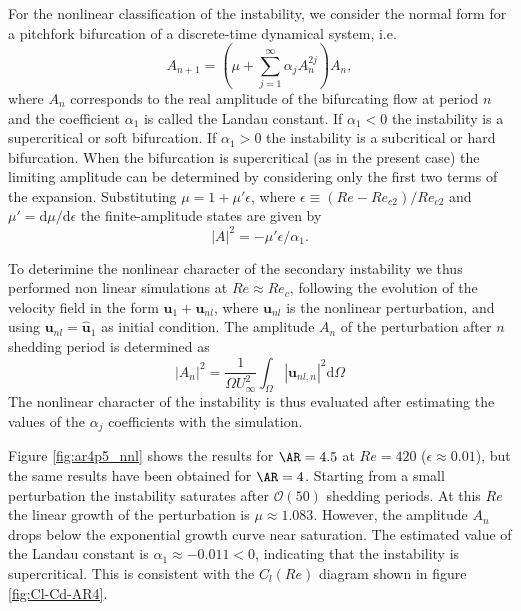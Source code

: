 For the nonlinear classification of the instability, we consider the normal form for a pitchfork bifurcation of a discrete-time dynamical system, i.e. 
%
\begin{equation}
  A_{n+1} = \left( \mu  + \sum_{j=1}^\infty \alpha_j A_n^{2j} \right) A_n,
\end{equation}
%
where $A_n$ corresponds to the real amplitude of the bifurcating flow at period $n$ and the coefficient $\alpha_1$ is called the Landau constant. If $\alpha_1 <0$ the instability is a supercritical or soft bifurcation. If $\alpha_1>0$ the instability is a subcritical or hard bifurcation. When the bifurcation is supercritical (as in the present case) the limiting amplitude can be determined by considering only the first two terms of the expansion. Substituting $\mu = 1 + \mu' \epsilon$, where $\epsilon \equiv (Re - Re_{c2})/Re_{c2}$ and $\mu' = \text{d}\mu/\text{d}\epsilon$ the finite-amplitude states are given by
%
\begin{equation}
  |A|^2 =- \mu' \epsilon / \alpha_1.
\end{equation}

To deterimine the nonlinear character of the secondary instability we thus performed non linear simulations at $Re \approx Re_c$, following the evolution of the velocity field in the form $\bm{u}_1 + \bm{u}_{nl}$, where $\bm{u}_{nl}$ is the nonlinear perturbation, and using $\bm{u}_{nl} = \hat{\bm{u}}_1$ as initial condition. The amplitude $A_n$ of the perturbation after $n$ shedding period is determined as
%
\begin{equation}
  |A_n|^2 = \frac{1}{\Omega U_\infty^2} \int_{\Omega} | \bm{u}_{nl,n} |^2 \text{d} \Omega
\end{equation}
%
The nonlinear character of the instability is thus evaluated after estimating the values of the $\alpha_j$ coefficients with the simulation.

Figure \ref{fig:ar4p5_nnl} shows the results for $\AR=4.5$ at $Re=420$ ($\epsilon \approx 0.01$), but the same results have been obtained for $\AR=4$. Starting from a small perturbation the instability saturates after $\mathcal{O}(50)$ shedding periods. At this $Re$ the linear growth of the perturbation is $\mu \approx 1.083$. However, the amplitude $A_n$ drops below the exponential growth curve near saturation. The estimated value of the Landau constant is $\alpha_1 \approx - 0.011 <0$, indicating that the instability is supercritical. This is consistent with the $C_l(Re)$ diagram shown in figure \ref{fig:Cl-Cd-AR4}.

